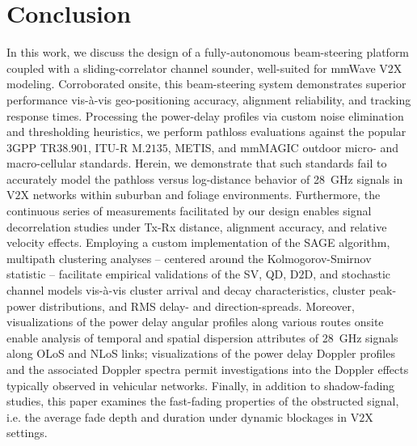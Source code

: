 \documentclass[12pt, draftcls, onecolumn]{IEEEtran}
\begin{document}
\section{Conclusion}\label{S6}
In this work, we discuss the design of a fully-autonomous beam-steering platform coupled with a sliding-correlator channel sounder, well-suited for mmWave V$2$X modeling. Corroborated onsite, this beam-steering system demonstrates superior performance vis-\`{a}-vis geo-positioning accuracy, alignment reliability, and tracking response times. Processing the power-delay profiles via custom noise elimination and thresholding heuristics, we perform pathloss evaluations against the popular $3$GPP TR$38.901$, ITU-R M$.2135$, METIS, and mmMAGIC outdoor micro- and macro-cellular standards. Herein, we demonstrate that such standards fail to accurately model the pathloss versus log-distance behavior of \SI{28}{\giga\hertz} signals in V$2$X networks within suburban and foliage environments. Furthermore, the continuous series of measurements facilitated by our design enables signal decorrelation studies under Tx-Rx distance, alignment accuracy, and relative velocity effects. Employing a custom implementation of the SAGE algorithm, multipath clustering analyses -- centered around the Kolmogorov-Smirnov statistic -- facilitate empirical validations of the SV, QD, D$2$D, and stochastic channel models vis-\`{a}-vis cluster arrival and decay characteristics, cluster peak-power distributions, and RMS delay- and direction-spreads. Moreover, visualizations of the power delay angular profiles along various routes onsite enable analysis of temporal and spatial dispersion attributes of \SI{28}{\giga\hertz} signals along OLoS and NLoS links; visualizations of the power delay Doppler profiles and the associated Doppler spectra permit investigations into the Doppler effects typically observed in vehicular networks. Finally, in addition to shadow-fading studies, this paper examines the fast-fading properties of the obstructed signal, i.e. the average fade depth and duration under dynamic blockages in V$2$X settings.
\vspace{-4mm}


 
\end{document}
